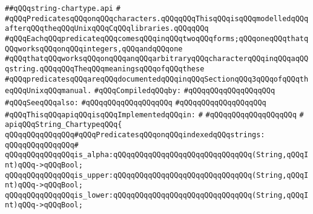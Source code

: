 \label{src/lib/std/src/string-chartype.api}
\verb|##qQQqstring-chartype.api|\newline
\verb|#|\newline
\verb|#qQQqPredicatesqQQqonqQQqcharacters.qQQqqQQqThisqQQqisqQQqmodelledqQQqafterqQQqtheqQQqUnixqQQqCqQQqlibraries.qQQqqQQq|\newline
\verb|#qQQqEachqQQqpredicateqQQqcomesqQQqinqQQqtwoqQQqforms;qQQqoneqQQqthatqQQqworksqQQqonqQQqintegers,qQQqandqQQqone|\newline
\verb|#qQQqthatqQQqworksqQQqonqQQqanqQQqarbitraryqQQqcharacterqQQqinqQQqaqQQqstring.qQQqqQQqTheqQQqmeaningsqQQqofqQQqthese|\newline
\verb|#qQQqpredicatesqQQqareqQQqdocumentedqQQqinqQQqSectionqQQq3qQQqofqQQqtheqQQqUnixqQQqmanual.|\newline
\newline
\verb|#qQQqCompiledqQQqby:|\newline
\verb|#qQQqqQQqqQQqqQQqqQQq|\newline
\newline
\verb|#qQQqSeeqQQqalso:|\newline
\verb|#qQQqqQQqqQQqqQQqqQQq|\newline
\verb|#qQQqqQQqqQQqqQQqqQQq|\newline
\newline
\verb|#qQQqThisqQQqapiqQQqisqQQqImplementedqQQqin:|\newline
\verb|#|\newline
\verb|#qQQqqQQqqQQqqQQqqQQq|\newline
\verb|#|\newline
\verb|apiqQQqString_ChartypeqQQq{|\newline
\newline
\verb|qQQqqQQqqQQqqQQq#qQQqPredicatesqQQqonqQQqindexedqQQqstrings:|\newline
\verb|qQQqqQQqqQQqqQQq#|\newline
\verb|qQQqqQQqqQQqqQQqis_alpha:qQQqqQQqqQQqqQQqqQQqqQQqqQQqqQQq(String,qQQqInt)qQQq->qQQqBool;|\newline
\verb|qQQqqQQqqQQqqQQqis_upper:qQQqqQQqqQQqqQQqqQQqqQQqqQQqqQQq(String,qQQqInt)qQQq->qQQqBool;|\newline
\verb|qQQqqQQqqQQqqQQqis_lower:qQQqqQQqqQQqqQQqqQQqqQQqqQQqqQQq(String,qQQqInt)qQQq->qQQqBool;|\newline
